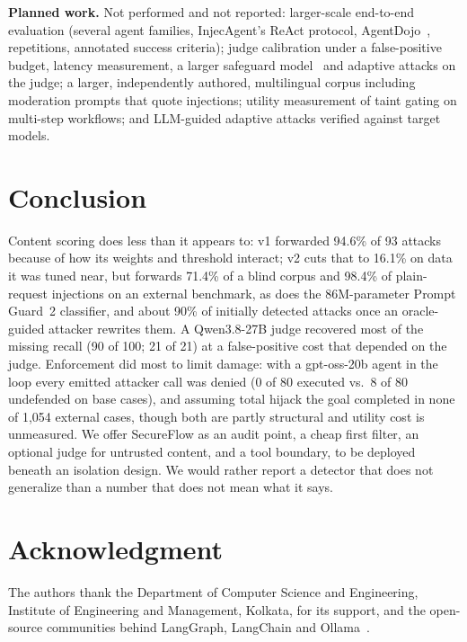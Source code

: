 \documentclass[conference]{IEEEtran}
\newif\ifanon
\begin{document}
\textbf{Planned work.} Not performed and not reported: larger-scale
end-to-end evaluation (several agent families, InjecAgent's ReAct protocol,
AgentDojo~\cite{debenedetti2024agentdojo}, repetitions, annotated success criteria);
judge calibration under a false-positive budget, latency measurement, a larger safeguard
model~\cite{inan2023llamaguard} and adaptive attacks on the judge; a larger,
independently authored, multilingual corpus including moderation prompts that quote
injections; utility measurement of taint gating on multi-step workflows; and LLM-guided
adaptive attacks verified against target models.

\section{Conclusion}

Content scoring does less than it appears to: v1 forwarded 94.6\% of 93 attacks because
of how its weights and threshold interact; v2 cuts that to 16.1\% on data it was tuned
near, but forwards 71.4\% of a blind corpus and 98.4\% of plain-request injections on an
external benchmark, as does the 86M-parameter Prompt Guard~2 classifier, and about 90\%
of initially detected attacks once an oracle-guided attacker rewrites them. A Qwen3.8-27B
judge recovered most of the missing recall (90 of 100; 21 of 21) at a false-positive cost
that depended on the judge. Enforcement did most to limit damage: with a gpt-oss-20b agent
in the loop every emitted attacker call was denied (0 of 80 executed vs.\ 8 of 80
undefended on base cases), and assuming total hijack the goal completed in none of
1{,}054 external cases, though both are partly structural and utility cost is unmeasured.
We offer SecureFlow as an audit point, a cheap first filter, an optional judge for
untrusted content, and a tool boundary, to be deployed beneath an isolation design. We
would rather report a detector that does not generalize than a number that does not mean
what it says.

\ifanon\else
\section*{Acknowledgment}
The authors thank the Department of Computer Science and Engineering, Institute of
Engineering and Management, Kolkata, for its support, and the open-source communities
behind LangGraph, LangChain and Ollama~\cite{ollama}.
\fi
\end{document}
